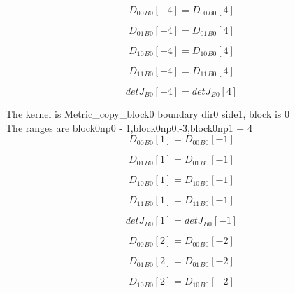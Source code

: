 \documentclass{article}
\begin{document}
\begin{dmath}{D_{00}{_{B0}}}[{-4}] = {D_{00}{_{B0}}}[{4}]\end{dmath}

\begin{dmath}{D_{01}{_{B0}}}[{-4}] = {D_{01}{_{B0}}}[{4}]\end{dmath}

\begin{dmath}{D_{10}{_{B0}}}[{-4}] = {D_{10}{_{B0}}}[{4}]\end{dmath}

\begin{dmath}{D_{11}{_{B0}}}[{-4}] = {D_{11}{_{B0}}}[{4}]\end{dmath}

\begin{dmath}{detJ{_{B0}}}[{-4}] = {detJ{_{B0}}}[{4}]\end{dmath}

\noindent The kernel is Metric_copy_block0 boundary dir0 side1, block is 0\\\noindent The ranges are block0np0 - 1,block0np0,-3,block0np1 + 4\\\begin{dmath}{D_{00}{_{B0}}}[{1}] = {D_{00}{_{B0}}}[{-1}]\end{dmath}

\begin{dmath}{D_{01}{_{B0}}}[{1}] = {D_{01}{_{B0}}}[{-1}]\end{dmath}

\begin{dmath}{D_{10}{_{B0}}}[{1}] = {D_{10}{_{B0}}}[{-1}]\end{dmath}

\begin{dmath}{D_{11}{_{B0}}}[{1}] = {D_{11}{_{B0}}}[{-1}]\end{dmath}

\begin{dmath}{detJ{_{B0}}}[{1}] = {detJ{_{B0}}}[{-1}]\end{dmath}

\begin{dmath}{D_{00}{_{B0}}}[{2}] = {D_{00}{_{B0}}}[{-2}]\end{dmath}

\begin{dmath}{D_{01}{_{B0}}}[{2}] = {D_{01}{_{B0}}}[{-2}]\end{dmath}

\begin{dmath}{D_{10}{_{B0}}}[{2}] = {D_{10}{_{B0}}}[{-2}]\end{dmath}
\end{document}
